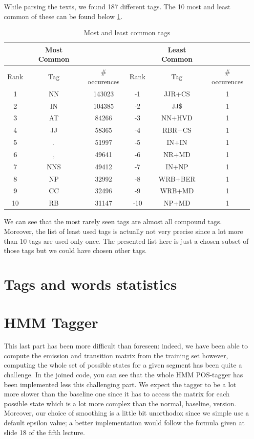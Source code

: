 \documentclass[10pt, a4paper, oneside]{article} %
\begin{document}
While parsing the texts, we found 187 different tags. The 10 most and least common of these can be found below \ref{tags}.
\begin{table}[!h]
\centering
\begin{tabular}{ | c | c | c | | c | c | c | }
\hline
& Most Common & & & Least Common & \\ \hline
Rank & Tag & \# occurences  & Rank & Tag & \# occurences\\ \hline
1 & NN & 143023 & -1 & JJR+CS & 1\\
2 & IN & 104385 & -2 & JJ\$ & 1\\
3 & AT & 84266 & -3 & NN+HVD & 1\\
4 & JJ & 58365 & -4 & RBR+CS & 1\\
5 & . & 51997 & -5 & IN+IN & 1\\
6 & , & 49641 & -6 & NR+MD & 1\\
7 & NNS & 49412 & -7 & IN+NP & 1\\
8 & NP & 32992 & -8 & WRB+BER & 1\\
9 & CC & 32496 & -9 & WRB+MD & 1\\
10 & RB & 31147 & -10 & NP+MD & 1\\ \hline
\end{tabular}
\caption{Most and least common tags}
\label{tags}
\end{table}

We can see that the most rarely seen tags are almost all compound tags. Moreover, the list of least used tags is actually not very precise since a lot more than 10 tags are used only once. The presented list here is just a chosen subset of those tags but we could have chosen other tags. 

\section{Tags and words statistics}
\section{HMM Tagger}

This last part has been more difficult than foreseen: indeed, we have been able to compute the emission and transition matrix from the training set however, computing the whole set of possible states for a given segment has been quite a challenge. In the joined code, you can see that the whole HMM POS-tagger has been implemented less this challenging part. We expect the tagger to be a lot more slower than the baseline one since it has to access the matrix for each possible state which is a lot more complex than the normal, baseline, version. Moreover, our choice of smoothing is a little bit unorthodox since we simple use a default epsilon value; a better implementation would follow the formula given at slide 18 of the fifth lecture. 
\end{document}
